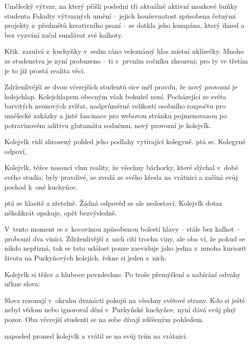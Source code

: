\documentclass[a5paper, twoside,12pt]{book}
\begin{document}
Umělecký výtvar, na který přišli poslední tři aktuálně aktivní mozkové buňky studenta Fakulty výtvarných umění -- jejich houževnatost způsobena četnými projekty z~předmětů kreativního psaní -- se dotkla jeho kumpána, který ihned a bez vyzvání začal sundávat své kalhoty.

Křik.  zaznívá z~kuchyňky v~sedm ráno veleznámý hlas místní uklízečky. Mnoho ze studenstva je nyní probuzeno -- ti v~prvním ročníku zhrozeni; pro ty ve třetím je to již prostá realita věci.

Zdrženlivější ze dvou včerejších studentů sice měl pravdu, že nový provozní je kolejchlap. Kolejchlapem obecným však bohužel není. Pocházející ze světa barvitých neonových zvířat, nadprůměrné velikosti osobního rozpočtu pro umělecké zakázky a jisté fascinace pro webovou stránku pojmenovanou po potravinovém aditivu glutamátu sodnému, nový provozní je kolejvlk.

Kolejvlk vidí zhrozený pohled jeho podlahy vytírající kolegyně.  ptá se. Kolegyně odpoví, 

Kolejvlk, těžce nesoucí vlnu reality, že všechny báchorky, které slýchal v~době svého studia, byly pravdivé, se zvedá ze svého křesla na vrátnici a začíná svůj pochod k~oné kuchyňce.

 ptá se hlasitě a zřetelně. Žádná odpověď se ale nedostaví. Kolejvlk dotaz několikrát opakuje, opět bezvýsledně. 

V~tento moment se s~kocovinou způsobenou bolestí hlavy -- stále bez kalhot -- probouzí dva viníci. Zdrženlivější z~nich cítí trochu viny, ale oba ví, že pokud se nikdo nepřizná, tak se tato událost pouze zaeviduje jako jedna z~mnoha kuriozit života na Purkyňových kolejích.  řekne si jeden z~nich.

Kolejvlk si těžce a hluboce povzdechne. Po troše přemýšlení a nabírání odvahy uřkne slova: 

Slova rezonují v~okruhu dvanácti pokojů na všechny světové strany. Kdo si ještě nebyl vědom nebo ignoroval dění v~Purkyňské kuchyňce, nyní dává svůj plný pozor. Oba včerejší studenti se na sebe dívají zděšeným pohledem.

 naposled pronesl kolejvlk a vrátil se na svůj trůn na vrátnici.
\end{document}
